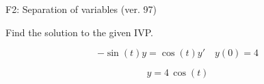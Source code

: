 \begin{exercise}
  \begin{exerciseTitle}F2: Separation of variables (ver. 97)\end{exerciseTitle}
  \begin{exerciseStatement}
    
Find the solution to the given IVP.

    
\[-\sin\left(t\right) y= \cos\left(t\right) y'\hspace{1em} y\left( 0 \right)= 4\]

  \end{exerciseStatement}
  \begin{exerciseAnswer}
    
\[y= 4 \, \cos\left(t\right)\]

  \end{exerciseAnswer}
\end{exercise}